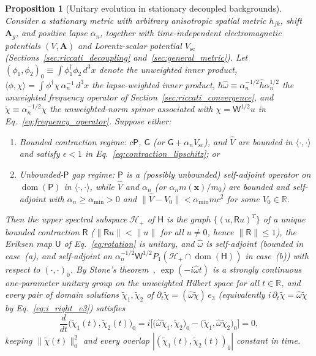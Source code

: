 \documentclass[aps,prd,onecolumn,tightenlines,nofootinbib,notitlepage,11pt,floatfix]{revtex4-2}
\theoremstyle{indentedtheorem}
\newtheorem{proposition}{Proposition}
\begin{document}
\begin{proposition}[Unitary evolution in stationary decoupled backgrounds]
\label{prop:unitary_norm}
Consider a stationary metric with arbitrary anisotropic spatial metric $h_{jk}$, shift $\mathbf{A}_g$, and positive lapse $\alpha_n$, together with time-independent electromagnetic potentials $(V,\mathbf{A})$ and Lorentz-scalar potential $V_\text{sc}$ (Sections~\ref{sec:riccati_decoupling} and~\ref{sec:general_metric}). Let $(\phi_1,\phi_2)_0 \equiv \int\phi_1^\dagger\phi_2\,d^3x$ denote the unweighted inner product, $\langle\phi,\chi\rangle = \int\phi^\dagger\chi\,\alpha_n^{-1}\,d^3x$ the lapse-weighted inner product, $\hbar\hat{\omega}\equiv\alpha_n^{-1/2}\hat{h}\alpha_n^{1/2}$ the unweighted frequency operator of Section~\ref{sec:riccati_convergence}, and $\tilde{\chi}\equiv\alpha_n^{-1/2}\chi$ the unweighted-norm spinor associated with $\chi=\mathsf{W}^{1/2}u$ in Eq.~\eqref{eq:frequency_operator}. Suppose either:
\begin{enumerate}[label=(\alph*)]
\item \emph{Bounded contraction regime:} $c\mathsf{P}$, $\mathsf{G}$ (or $\mathsf{G}+\alpha_n V_\text{sc}$), and $\hat{V}$ are bounded in $\langle\cdot,\cdot\rangle$ and satisfy $\epsilon < 1$ in Eq.~\eqref{eq:contraction_lipschitz}; or
\item \emph{Unbounded-$\mathsf{P}$ gap regime:} $\mathsf{P}$ is a (possibly unbounded) self-adjoint operator on $\operatorname{dom}(\mathsf{P})$ in $\langle\cdot,\cdot\rangle$, while $\hat{V}$ and $\alpha_n$ (or $\alpha_n m(\mathbf{x})/m_0$) are bounded and self-adjoint with $\alpha_n \ge \alpha_{\min} > 0$ and $\|\hat{V}-V_0\| < \alpha_{\min} mc^2$ for some $V_0\in\mathbb{R}$.
\end{enumerate}
Then the upper spectral subspace $\mathcal{H}_+$ of $\mathsf{H}$ is the graph $\{(u,\mathsf{R}u)^T\}$ of a unique bounded contraction $\mathsf{R}$ ($\|\mathsf{R}u\|<\|u\|$ for all $u\neq 0$, hence $\|\mathsf{R}\|\le 1$), the Eriksen map $\mathsf{U}$ of Eq.~\eqref{eq:rotation} is unitary, and $\hat{\omega}$ is self-adjoint (bounded in case~(a), and self-adjoint on $\alpha_n^{-1/2}\mathsf{W}^{1/2}P_1(\mathcal{H}_+\cap\operatorname{dom}(\mathsf{H}))$ in case~(b)) with respect to $(\cdot,\cdot)_0$. By Stone's theorem~\citep{Stone1932}, $\exp(-i\hat{\omega}t)$ is a strongly continuous one-parameter unitary group on the unweighted Hilbert space for all $t\in\mathbb{R}$, and every pair of domain solutions $\tilde{\chi}_1,\tilde{\chi}_2$ of $\partial_t\tilde{\chi} = (\hat{\omega}\tilde{\chi})\,e_3$ (equivalently $i\,\partial_t\tilde{\chi} = \hat{\omega}\tilde{\chi}$ by Eq.~\eqref{eq:i_right_e3}) satisfies
\begin{equation}
    \frac{d}{dt}\big(\tilde{\chi}_1(t),\tilde{\chi}_2(t)\big)_0 = i\Big[\big(\hat{\omega}\tilde{\chi}_1,\tilde{\chi}_2\big)_0 - \big(\tilde{\chi}_1,\hat{\omega}\tilde{\chi}_2\big)_0\Big] = 0 ,
    \label{eq:unitary_inner_product}
\end{equation}
keeping $\|\tilde{\chi}(t)\|_0^2$ and every overlap $|(\tilde{\chi}_1(t),\tilde{\chi}_2(t))_0|$ constant in time.
\end{proposition}
\end{document}
